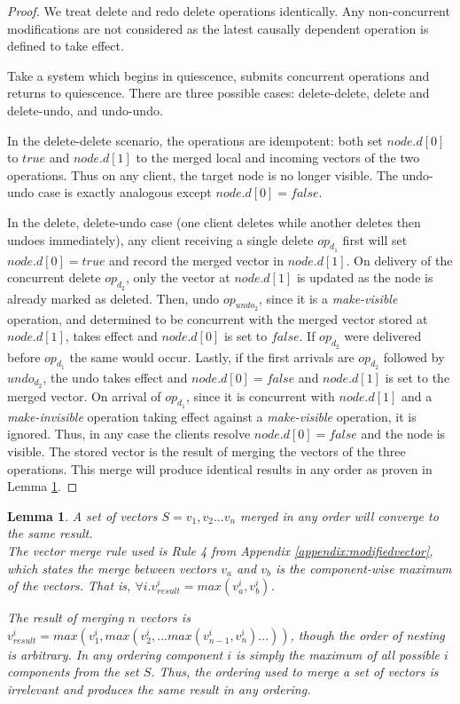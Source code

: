 \documentclass[12pt,a4paper,twoside,openright]{report}
\newtheorem{lemma}{Lemma}
\begin{document}
	\begin{proof}
	
		We treat delete and redo delete operations identically. Any non-concurrent modifications are not considered as the latest causally dependent operation is defined to take effect.
		
		Take a system which begins in quiescence, submits concurrent operations and returns to quiescence. There are three possible cases: delete-delete, delete and delete-undo, and undo-undo.
		
		In the delete-delete scenario, the operations are idempotent: both set $node.d[0]$ to $true$ and $node.d[1]$ to the merged local and incoming vectors of the two operations. Thus on any client, the target node is no longer visible. The undo-undo case is exactly analogous except $node.d[0] = false$. 
		
		In the delete, delete-undo case (one client deletes while another deletes then undoes immediately), any client receiving a single delete $op_{d_1}$ first will set $node.d[0] = true$ and record the merged vector in $node.d[1]$. On delivery of the concurrent delete $op_{d_2}$, only the vector at $node.d[1]$ is updated as the node is already marked as deleted. Then, undo $op_{undo_2}$, since it is a \textit{make-visible} operation, and determined to be concurrent with the merged vector stored at $node.d[1]$, takes effect and $node.d[0]$ is set to $false$. If $op_{d_2}$ were delivered before $op_{d_1}$ the same would occur. Lastly, if the first arrivals are $op_{d_2}$ followed by $undo_{d_2}$, the undo takes effect and $node.d[0] = false$ and $node.d[1]$ is set to the merged vector. On arrival of $op_{d_1}$, since it is concurrent with $node.d[1]$ and a \textit{make-invisible} operation taking effect against a \textit{make-visible} operation, it is ignored. Thus, in any case the clients resolve $node.d[0] = false$ and the node is visible. The stored vector is the result of merging the vectors of the three operations. This merge will produce identical results in any order as proven in Lemma \ref{VectorMergeLemma}.
		
	\end{proof}
	
	\begin{lemma}\label{VectorMergeLemma}
		A set of vectors $S = {v_1, v_2... v_n}$ merged in any order will converge to the same result.\\
		The vector merge rule used is Rule 4 from Appendix \ref{appendix:modifiedvector}, which states the merge between vectors $v_a$ and $v_b$ is the component-wise maximum of the vectors. That is, $\forall i. v_{result}^i = max(v_a^i, v_b^i)$.
		
		The result of merging $n$ vectors is $v_{result}^i = max(v_1^i, max(v_2^i,...max(v_{n-1}^i, v_n^i)...))$, though the order of nesting is arbitrary. In any ordering component $i$ is simply the maximum of all possible $i$ components from the set $S$. Thus, the ordering used to merge a set of vectors is irrelevant and produces the same result in any ordering.
		
	\end{lemma}
\end{document}
